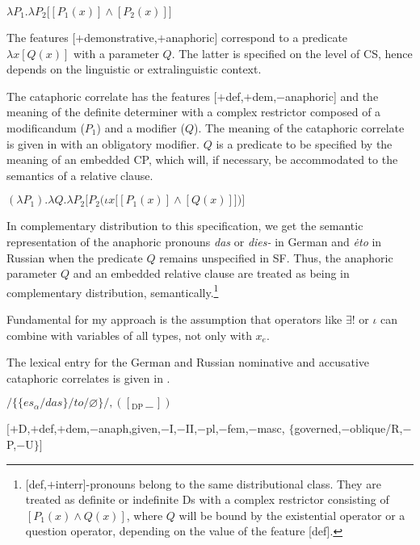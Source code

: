 \documentclass[output=paper,
colorlinks,
citecolor=brown,
newtxmath
]{langscibook}
\begin{document}
\ea\label{ex:Det_Russ} $\lambda P_1 . \lambda P_2 \big[[P_1 (x)] \wedge [P_2 (x)]\big]$ \z

\noindent The features [$+$demonstrative,$+$anaphoric] correspond to a predicate $\lambda x [Q (x)]$ with a parameter $Q$. The latter is specified on the level of CS, hence depends on the linguistic or extralinguistic context.

The cataphoric correlate has the features [$+$def,$+$dem,$-$anaphoric] and the meaning of the definite determiner with a complex restrictor composed of a modificandum ($P_1$) and a modifier ($Q$). The meaning of the cataphoric correlate is given in  with an obligatory modifier. $Q$ is a predicate to be specified by the meaning of an embedded CP, which will, if necessary, be accommodated to the semantics of a relative clause.

\ea\label{ex:defDet} $(\lambda P_1) . \lambda Q . \lambda P_2 \Big[P_2 \big(\iota x \big[[P_1 (x)]\wedge [Q (x)]\big]\big)\Big]$ \z

\noindent In complementary distribution to this specification, we get the semantic representation of the anaphoric pronouns \textit{das} or \textit{dies-} in German and \textit{ėto} in Russian when the predicate $Q$ remains unspecified in SF. Thus, the anaphoric parameter $Q$ and an embedded relative clause are treated as being in complementary distribution, semantically.\footnote{[\textalpha def,$+$interr]-pronouns belong to the same distributional class. They are treated as definite or indefinite Ds with a complex restrictor consisting of $[P_1 (x) \wedge Q (x)]$, where $Q$ will be bound by the existential operator or a question operator, depending on the value of the feature [\textalpha def].}

Fundamental for my approach is the assumption that operators like $\exists$! or $\iota$ can combine with variables of all types, not only with $x_{e}$.

The lexical entry for the German and Russian nominative and accusative cataphoric correlates is given in .

\ea\label{ex:15}
    \ea\label{ex:15a}
    $/\big\{\{es_{\alpha}/das\}/to/\varnothing\big\}/, ([_\textrm{DP} \, \_\_ \, ])$\textsubscript{\textalpha}

    \ex\label{ex:15b}
    $\lbrack+$D,$+$def,$+$dem,$-$anaph,\textbeta given,$-$I,$-$II,$-$pl,$-$fem,$-$masc, \newline $\lbrace$\textgamma governed,$-$oblique/\textgamma R,$-$P,$-$U$\rbrace\rbrack$
\end{document}
